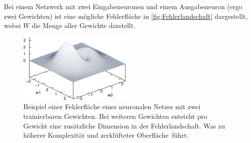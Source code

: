 Bei einem Netzwerk mit zwei Eingabeneuronen und einem Ausgabeneuron (ergo zwei Gewichten) ist eine mögliche Fehlerfläche in \autoref{fig:Fehlerlandschaft} dargestellt, wobei $W$ die Menge aller Gewichte darstellt.

\begin{figure}[!htb]
    \centering
        \includegraphics[width=0.5\textwidth]{Bilder/misc/Fehlerlandschaft.png}
    \caption[Beispiel einer Fehlerfläche eines künstlichen neuronalen Netzes]{Beispiel einer Fehlerfläche eines neuronalen Netzes mit zwei trainierbaren Gewichten. Bei weiteren Gewichten entsteht pro Gewicht eine zusätzliche Dimension in der Fehlerlandschaft. Was zu höherer Komplexität und zerklüfteter \glqq Oberfläche\grqq~führt.\protect\footnotemark{}}
    \label{fig:Fehlerlandschaft}
\end{figure}
\addtocounter{footnote}{-1}     %
\addtocounter{Hfootnote}{-1}    %
\wrapfigfoot{}

